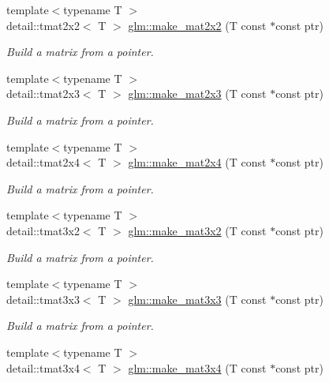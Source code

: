 \begin{DoxyCompactItemize}
{\footnotesize template$<$typename T $>$ }\\detail\-::tmat2x2$<$ T $>$ \hyperlink{group__gtc__type__ptr_ga1d0007368a23e89e4a0efcda06c1fa27}{glm\-::make\-\_\-mat2x2} (T const $\ast$const ptr)
\begin{DoxyCompactList}\small\item\em Build a matrix from a pointer. \end{DoxyCompactList}\item 
{\footnotesize template$<$typename T $>$ }\\detail\-::tmat2x3$<$ T $>$ \hyperlink{group__gtc__type__ptr_ga87d29f47fbd3990a344be2eac404aee3}{glm\-::make\-\_\-mat2x3} (T const $\ast$const ptr)
\begin{DoxyCompactList}\small\item\em Build a matrix from a pointer. \end{DoxyCompactList}\item 
{\footnotesize template$<$typename T $>$ }\\detail\-::tmat2x4$<$ T $>$ \hyperlink{group__gtc__type__ptr_gaab3df4b27b38505f1413f507ebc43d18}{glm\-::make\-\_\-mat2x4} (T const $\ast$const ptr)
\begin{DoxyCompactList}\small\item\em Build a matrix from a pointer. \end{DoxyCompactList}\item 
{\footnotesize template$<$typename T $>$ }\\detail\-::tmat3x2$<$ T $>$ \hyperlink{group__gtc__type__ptr_ga8764d696bd4dfb91d689ca196414b36b}{glm\-::make\-\_\-mat3x2} (T const $\ast$const ptr)
\begin{DoxyCompactList}\small\item\em Build a matrix from a pointer. \end{DoxyCompactList}\item 
{\footnotesize template$<$typename T $>$ }\\detail\-::tmat3x3$<$ T $>$ \hyperlink{group__gtc__type__ptr_ga56ddd61c1c64dba464e392b2c2011226}{glm\-::make\-\_\-mat3x3} (T const $\ast$const ptr)
\begin{DoxyCompactList}\small\item\em Build a matrix from a pointer. \end{DoxyCompactList}\item 
{\footnotesize template$<$typename T $>$ }\\detail\-::tmat3x4$<$ T $>$ \hyperlink{group__gtc__type__ptr_gaae2b48f5109461f13f63ccf5b4cde672}{glm\-::make\-\_\-mat3x4} (T const $\ast$const ptr)

\end{DoxyCompactItemize}
